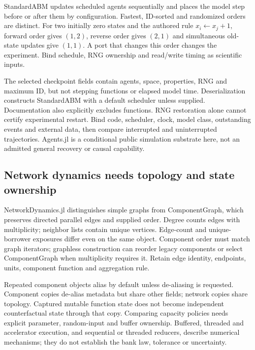 StandardABM updates scheduled agents sequentially and places the model step
before or after them by configuration. Fastest, ID-sorted and randomized
orders are distinct. For two initially zero states and the authored rule
$x_i\leftarrow x_j+1$, forward order gives $(1,2)$, reverse order gives
$(2,1)$ and simultaneous old-state updates give $(1,1)$. A port that changes
this order changes the experiment. Bind schedule, RNG ownership and read/write
timing as scientific inputs.~\citep{exec25_onet_agents,exec25_onet_choice}

The selected checkpoint fields contain agents, space, properties, RNG and
maximum ID, but not stepping functions or elapsed model time. Deserialization
constructs StandardABM with a default scheduler unless supplied. Documentation
also explicitly excludes functions. RNG restoration alone cannot certify
experimental restart. Bind code, scheduler, clock, model class, outstanding
events and external data, then compare interrupted and uninterrupted
trajectories. Agents.jl is a conditional public simulation substrate here,
not an admitted general recovery or causal capability.
\citep{exec25_onet_agents,exec25_onet_choice}

\subsection{Network dynamics needs topology and state ownership}

NetworkDynamics.jl distinguishes simple graphs from ComponentGraph, which
preserves directed parallel edges and supplied order. Degree counts edges
with multiplicity; neighbor lists contain unique vertices. Edge-count and
unique-borrower exposures differ even on the same object. Component order
must match graph iterators; graphless construction can reorder legacy
components or select ComponentGraph when multiplicity requires it. Retain
edge identity, endpoints, units, component function and aggregation rule.
\citep{exec25_onet_dynamics}

Repeated component objects alias by default unless de-aliasing is requested.
Component copies de-alias metadata but share other fields; network copies
share topology. Captured mutable function state does not become independent
counterfactual state through that copy. Comparing capacity policies needs
explicit parameter, random-input and buffer ownership. Buffered, threaded and
accelerator execution, and sequential or threaded reducers, describe numerical
mechanisms; they do not establish the bank law, tolerance or uncertainty.
\citep{exec25_onet_dynamics,exec25_onet_choice}

